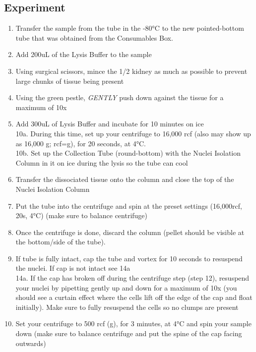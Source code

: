 \documentclass[
]{article}
\providecommand{\tightlist}{%
  \setlength{\itemsep}{0pt}\setlength{\parskip}{0pt}}
\begin{document}
\subsection{Experiment}\label{experiment}

\begin{enumerate}
\def\labelenumi{\arabic{enumi}.}
\setcounter{enumi}{5}
\tightlist
\item
  Transfer the sample from the tube in the -80°C to the new
  pointed-bottom tube that was obtained from the Consumables Box.
\item
  Add 200uL of the Lysis Buffer to the sample
\item
  Using surgical scissors, mince the 1/2 kidney as much as possible to
  prevent large chunks of tissue being present
\item
  Using the green pestle, \emph{GENTLY} push down against the tissue for
  a maximum of 10x
\item
  Add 300uL of Lysis Buffer and incubate for 10 minutes on ice\\
  10a. During this time, set up your centrifuge to 16,000 rcf (also may
  show up as 16,000 g; rcf=g), for 20 seconds, at 4°C.\\
  10b. Set up the Collection Tube (round-bottom) with the Nuclei
  Isolation Column in it on ice during the lysis so the tube can cool
\item
  Transfer the dissociated tissue onto the column and close the top of
  the Nuclei Isolation Column
\item
  Put the tube into the centrifuge and spin at the preset settings
  (16,000rcf, 20s, 4°C) (make sure to balance centrifuge)
\item
  Once the centrifuge is done, discard the column (pellet should be
  visible at the bottom/side of the tube).
\item
  If tube is fully intact, cap the tube and vortex for 10 seconds to
  resuspend the nuclei. If cap is not intact see 14a\\
  14a. If the cap has broken off during the centrifuge step (step 12),
  resuspend your nuclei by pipetting gently up and down for a maximum of
  10x (you should see a curtain effect where the cells lift off the edge
  of the cap and float initially). Make sure to fully resuspend the
  cells so no clumps are present
\item
  Set your centrifuge to 500 rcf (g), for 3 minutes, at 4°C and spin
  your sample down (make sure to balance centrifuge and put the spine of
  the cap facing outwards)

\end{enumerate}
\end{document}
